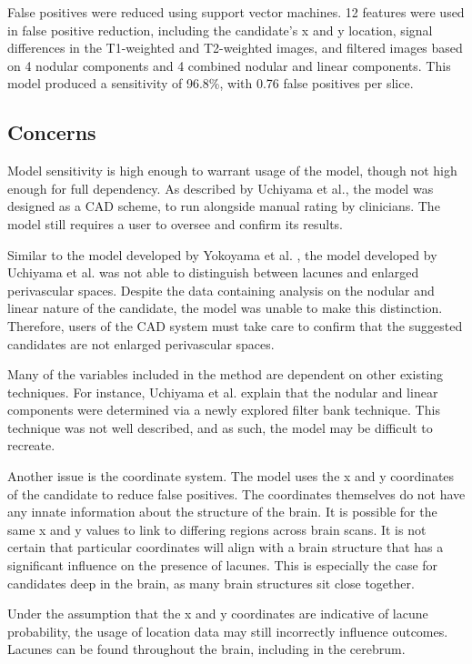 False positives were reduced using support vector machines. 12 features were used in false positive reduction, including the candidate's x and y location, signal differences in the T1-weighted and T2-weighted images, and filtered images based on 4 nodular components and 4 combined nodular and linear components. This model produced a sensitivity of 96.8\%, with 0.76 false positives per slice.

\subsection*{Concerns}

Model sensitivity is high enough to warrant usage of the model, though not high enough for full dependency. As described by Uchiyama et al., the model was designed as a CAD scheme, to run alongside manual rating by clinicians. The model still requires a user to oversee and confirm its results. 
 
Similar to the model developed by Yokoyama et al. \cite{Yokoyama2007}, the model developed by Uchiyama et al. was not able to distinguish between lacunes and enlarged perivascular spaces. Despite the data containing analysis on the nodular and linear nature of the candidate, the model was unable to make this distinction. Therefore, users of the CAD system must take care to confirm that the suggested candidates are not enlarged perivascular spaces.

Many of the variables included in the method are dependent on other existing techniques. For instance, Uchiyama et al. explain that the nodular and linear components were determined via a newly explored filter bank technique. This technique was not well described, and as such, the model may be difficult to recreate.

Another issue is the coordinate system. The model uses the x and y coordinates of the candidate to reduce false positives. The coordinates themselves do not have any innate information about the structure of the brain. It is possible for the same x and y values to link to differing regions across brain scans. It is not certain that particular coordinates will align with a brain structure that has a significant influence on the presence of lacunes. This is especially the case for candidates deep in the brain, as many brain structures sit close together. 

Under the assumption that the x and y coordinates are indicative of lacune probability, the usage of location data may still incorrectly influence outcomes. Lacunes can be found throughout the brain, including in the cerebrum. 

